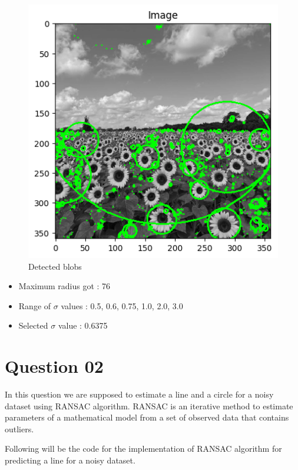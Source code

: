 \documentclass[11pt,a4paper]{article}
\begin{document}
{\begin{figure}[h]
    \centering
    \includegraphics[width=0.825\linewidth]{images/12.png}
    \caption{Detected blobs }
\end{figure}}

\newpage
\begin{itemize}
    \item Maximum radius got : 76
    \item Range of $\sigma$ values : 0.5, 0.6, 0.75, 1.0, 2.0, 3.0
    \item Selected $\sigma$ value : 0.6375
\end{itemize}

\section{Question 02}

In this question we are supposed to estimate a line and a circle for a noisy dataset using RANSAC algorithm.
RANSAC is an iterative method to estimate parameters of a mathematical model from a set of observed data that contains outliers.

Following will be the code for the implementation of RANSAC algorithm for predicting a line for a noisy dataset.

\lstset{style=mystyle}


\newpage
\end{document}
